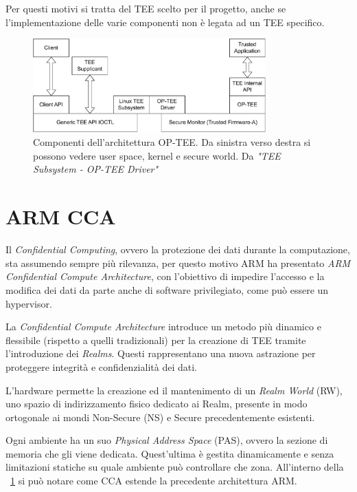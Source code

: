 \documentclass[12pt,italian]{report}
\begin{document}
	Per questi motivi si tratta del TEE scelto per il progetto, anche se l'implementazione delle varie componenti non è legata ad un TEE specifico.
	
	\begin{figure}[h]
		\centering
		\includegraphics[width=0.8\textwidth]{immagini/optee-system-architecture}
		\caption{ Componenti dell'architettura OP-TEE. Da sinistra verso destra si possono vedere user space, kernel e secure world. Da \textit{"TEE Subsystem - OP-TEE Driver"} \cite{linux_tee_subsystem} }
		\label{fig:optee-architecture}
	\end{figure}
	
	\newpage

	\section{ARM CCA} 
	\label{sec:cca}
	Il \textit{Confidential Computing}, ovvero la protezione dei dati durante la computazione, sta assumendo sempre più rilevanza, per questo motivo ARM ha presentato \textit{ARM Confidential Compute Architecture}, con l'obiettivo di impedire l'accesso e la modifica dei dati da parte anche di software privilegiato, come può essere un hypervisor.

	\bigbreak

	La \textit{Confidential Compute Architecture} introduce un metodo più dinamico e flessibile (rispetto a quelli tradizionali) per la creazione di TEE tramite l'introduzione dei \textit{Realms}. Questi rappresentano una nuova astrazione per proteggere integrità e confidenzialità dei dati.

	L'hardware permette la creazione ed il mantenimento di un \textit{Realm World} (RW), uno spazio di indirizzamento fisico dedicato ai Realm, presente in modo ortogonale ai mondi Non-Secure (NS) e Secure precedentemente esistenti. 
	
	Ogni ambiente ha un suo \textit{Physical Address Space} (PAS), ovvero la sezione di memoria che gli viene dedicata. Quest'ultima è gestita dinamicamente e senza limitazioni statiche su quale ambiente può controllare che zona. All'interno della \figurename~\ref{fig:optee-architecture} si può notare come CCA estende la precedente architettura ARM.
\end{document}
